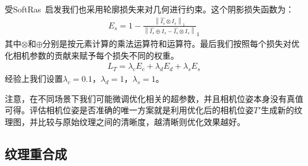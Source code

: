 受SoftRas~\cite{ShichenLiu2019SoftRA}启发我们也采用轮廓损失来对几何进行约束。这个阴影损失函数为：
\begin{align}
	E_s = 1 - \frac{\left \| \hat{I_s}\otimes I_s  \right \|_1 }{\left \| \hat{I_s}\oplus  I_s- \hat{I_s}\otimes I_s \right \| }_1  
\end{align}
其中$\otimes $和$\oplus $分别是按元素计算的乘法运算符和运算符。最后我们按照每个损失对优化相机参数的贡献来赋予每个损失不同的权重。
\begin{align}
	L_T = \lambda_c E_c + \lambda_d E_d +\lambda_s E_s \label{pose}
\end{align}经验上我们设置$\lambda_c = 0.1$，$\lambda_d = 1$，$\lambda_s = 1$。\par
注意，在不同场景下我们可能微调优化相关的超参数，并且相机位姿本身没有真值可得。评估相机位姿是否准确的唯一方案就是利用优化后的相机位姿$T'$生成新的纹理图，并比较与原始纹理之间的清晰度，越清晰则优化效果越好。

%
\subsection{纹理重合成}


